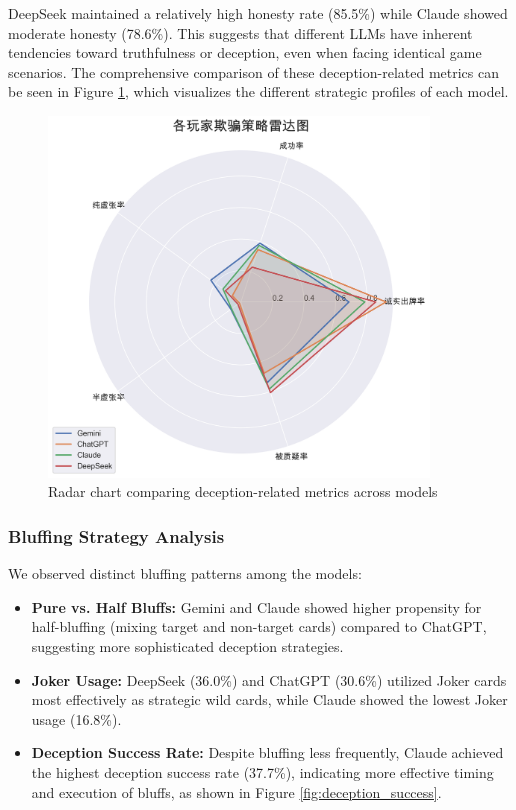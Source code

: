 \documentclass{article}
\begin{document}
DeepSeek maintained a relatively high honesty rate (85.5\%) while Claude showed moderate honesty (78.6\%). This suggests that different LLMs have inherent tendencies toward truthfulness or deception, even when facing identical game scenarios. The comprehensive comparison of these deception-related metrics can be seen in Figure \ref{fig:deception_radar}, which visualizes the different strategic profiles of each model.

\begin{figure}[H]
    \centering
    \includegraphics[width=0.9\textwidth]{figures/deception_radar.png}
    \caption{Radar chart comparing deception-related metrics across models}
    \label{fig:deception_radar}
\end{figure}

\subsubsection{Bluffing Strategy Analysis}
We observed distinct bluffing patterns among the models:
\begin{itemize}
    \item \textbf{Pure vs. Half Bluffs:} Gemini and Claude showed higher propensity for half-bluffing (mixing target and non-target cards) compared to ChatGPT, suggesting more sophisticated deception strategies.
    \item \textbf{Joker Usage:} DeepSeek (36.0\%) and ChatGPT (30.6\%) utilized Joker cards most effectively as strategic wild cards, while Claude showed the lowest Joker usage (16.8\%).
    \item \textbf{Deception Success Rate:} Despite bluffing less frequently, Claude achieved the highest deception success rate (37.7\%), indicating more effective timing and execution of bluffs, as shown in Figure \ref{fig:deception_success}.
\end{itemize}
\end{document}
